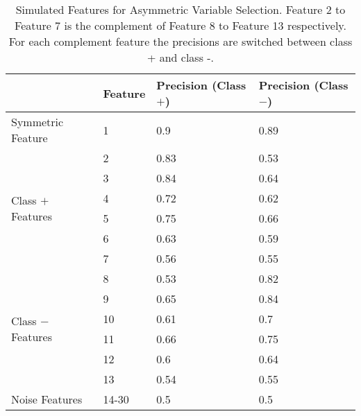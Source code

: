 \documentclass[twoside,11pt]{article}
\begin{document}
\begin{table}[htbp]
  \centering
  \caption{Simulated Features for Asymmetric Variable Selection. Feature 2 to Feature 7 is the complement of Feature 8 to Feature 13 respectively. For each complement feature the precisions are switched between class + and class -.}
 \begin{tabular}{p{1.5cm}p{1.5cm}p{1.7cm}p{1.7cm}}
\hline
      & Feature & Precision (Class $+$) & Precision (Class $-$) \bigstrut\\
\hline
Symmetric Feature & 1     & 0.9   & 0.89 \bigstrut\\
\hline
\multirow{6}{1.5cm}{Class $+$ Features} & 2     & 0.83  & 0.53 \bigstrut[t]\\
& 3     & 0.84  & 0.64 \\
 & 4     & 0.72  & 0.62 \\
 & 5     & 0.75  & 0.66 \\
 & 6     & 0.63  & 0.59 \\
 & 7     & 0.56  & 0.55 \bigstrut[b]\\
\hline
\multirow{6}{1.5cm}{Class $-$ Features} & 8     & 0.53  & 0.82 \bigstrut[t]\\
& 9     & 0.65  & 0.84 \\
 & 10    & 0.61  & 0.7 \\
 & 11    & 0.66  & 0.75 \\
 & 12    & 0.6   & 0.64 \\
 & 13    & 0.54  & 0.55 \\
 \hline
Noise Features & 14-30 & 0.5   & 0.5 \bigstrut[b]\\
\hline
\end{tabular}%
  \label{tab:asymmetricfeatures1}%
\end{table}%
\end{document}
